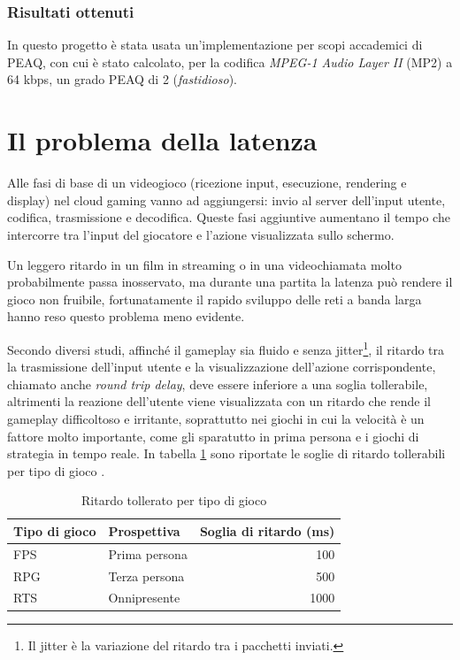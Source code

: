 \subsubsection{Risultati ottenuti}
In questo progetto è stata usata un'implementazione per scopi accademici di PEAQ, con cui è stato calcolato, per la codifica \textit{MPEG-1 Audio Layer II} (MP2) a 64 kbps, un grado PEAQ di 2 (\textit{fastidioso}).




\section{Il problema della latenza} \label{sec:cap4_Latenza}
Alle fasi di base di un videogioco (ricezione input, esecuzione, rendering e display) nel cloud gaming vanno ad aggiungersi: invio al server dell'input utente, codifica, trasmissione e decodifica. Queste fasi aggiuntive aumentano il tempo che intercorre tra l'input del giocatore e l'azione visualizzata sullo schermo.

Un leggero ritardo in un film in streaming o in una videochiamata molto probabilmente passa inosservato, ma durante una partita la latenza può rendere il gioco non fruibile, fortunatamente il rapido sviluppo delle reti a banda larga hanno reso questo problema meno evidente. %

Secondo diversi studi, affinché il gameplay sia fluido e senza jitter\footnote{Il jitter è la variazione del ritardo tra i pacchetti inviati.}, il ritardo tra la trasmissione dell'input utente e la visualizzazione dell'azione corrispondente, chiamato anche \textit{round trip delay}, deve essere inferiore a una soglia tollerabile, altrimenti la reazione dell'utente viene visualizzata con un ritardo che rende il gameplay difficoltoso e irritante, soprattutto nei giochi in cui la velocità è un fattore molto importante, come gli sparatutto in prima persona e i giochi di strategia in tempo reale. In tabella \ref{table:Ritardo_tollerato_per_tipo_di_gioco} sono riportate le soglie di ritardo tollerabili per tipo di gioco \parencite{Cloud_Gaming_Architecture_and_Performance}.

\begin{table}[H]
	\centering
	\begin{tabular}{||l l r||}
		\hline
		Tipo di gioco & Prospettiva & Soglia di ritardo (ms) \\
		\hline\hline
		FPS & Prima persona & 100 \\
		\hline
		RPG & Terza persona & 500 \\
		\hline
		RTS & Onnipresente & 1000 \\
		\hline
	\end{tabular}

	\caption{Ritardo tollerato per tipo di gioco}
	\label{table:Ritardo_tollerato_per_tipo_di_gioco}
\end{table}



